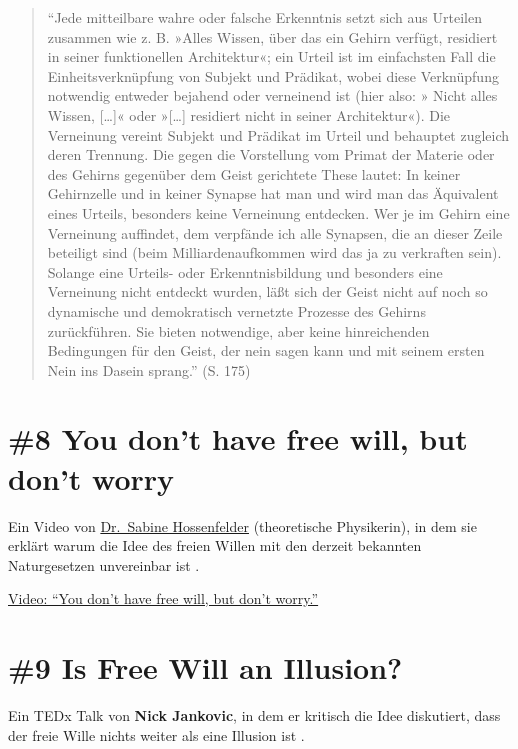 \documentclass[
  a4paper,
]{report}
\begin{document}
\begin{quote}
``Jede mitteilbare wahre oder falsche Erkenntnis setzt sich aus Urteilen zusammen wie z. B. »Alles Wissen, über das ein Gehirn verfügt, residiert in seiner funktionellen Architektur«; ein Urteil ist im einfachsten Fall die Einheitsverknüpfung von Subjekt und Prädikat, wobei diese Verknüpfung notwendig entweder bejahend oder verneinend ist (hier also: » Nicht alles Wissen, {[}\ldots{]}« oder »{[}\ldots{]} residiert nicht in seiner Architektur«). Die Verneinung vereint Subjekt und Prädikat im Urteil und behauptet zugleich deren Trennung. Die gegen die Vorstellung vom Primat der Materie oder des Gehirns gegenüber dem Geist gerichtete These lautet: In keiner Gehirnzelle und in keiner Synapse hat man und wird man das Äquivalent eines Urteils, besonders keine Verneinung entdecken. Wer je im Gehirn eine Verneinung auffindet, dem verpfände ich alle Synapsen, die an dieser Zeile beteiligt sind (beim Milliardenaufkommen wird das ja zu verkraften sein). Solange eine Urteils- oder Erkenntnisbildung und besonders eine Verneinung nicht entdeckt wurden, läßt sich der Geist nicht auf noch so dynamische und demokratisch vernetzte Prozesse des Gehirns zurückführen. Sie bieten notwendige, aber keine hinreichenden Bedingungen für den Geist, der nein sagen kann und mit seinem ersten Nein ins Dasein sprang.'' (S. 175)
\end{quote}

\hypertarget{def-ev8}{%
\section{\#8 You don't have free will, but don't worry}\label{def-ev8}}

Ein Video von \href{https://sabinehossenfelder.com}{Dr.~Sabine Hossenfelder} (theoretische Physikerin), in dem sie erklärt warum die Idee des freien Willen mit den derzeit bekannten Naturgesetzen unvereinbar ist \citep{Hossenfelder2020}.

\href{https://www.youtube.com/watch?v=zpU_e3jh_FY}{Video: ``You don't have free will, but don't worry.''}

\hypertarget{def-ev9}{%
\section{\#9 Is Free Will an Illusion?}\label{def-ev9}}

Ein TEDx Talk von \textbf{Nick Jankovic}, in dem er kritisch die Idee diskutiert, dass der freie Wille nichts weiter als eine Illusion ist \citep{Jankovic2021}.
\end{document}
